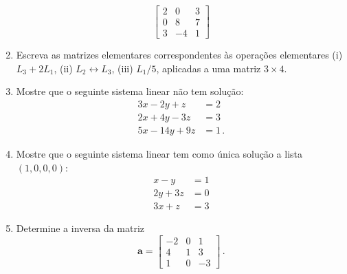 \documentclass[12pt,a4paper]{article}
\newcommand{\mb}{\mathbf}
\begin{document}
\begin{enumerate}
$$\begin{bmatrix}
    2&0&3\\
    0&8&7\\
    3&-4&1
  \end{bmatrix}$$
  \item Escreva as matrizes elementares correspondentes às operações elementares (i) $L_3+2L_1$, (ii) $L_2\leftrightarrow L_3$, (iii) $L_1/5$, aplicadas a uma matriz $3\times 4$.
  \item Mostre que o seguinte sistema linear não tem solução:
  \begin{equation*}
    \begin{split}
      3x-2y+z&=2\\
      2x+4y-3z&=3\\
      5x-14y+9z&=1\,.
    \end{split}
  \end{equation*}
  \item Mostre que o seguinte sistema linear tem como única solução a lista $(1,0,0,0)$:
  \begin{equation*}
    \begin{split}
      x-y&=1\\
      2y+3z&=0\\
      3x+z&=3
    \end{split}
  \end{equation*}
  \item Determine a inversa da matriz
  $$\mb a=\begin{bmatrix}
    -2&0&1\\
    4&1&3\\
    1&0&-3
  \end{bmatrix}\,.$$
\end{enumerate}
\end{document}
